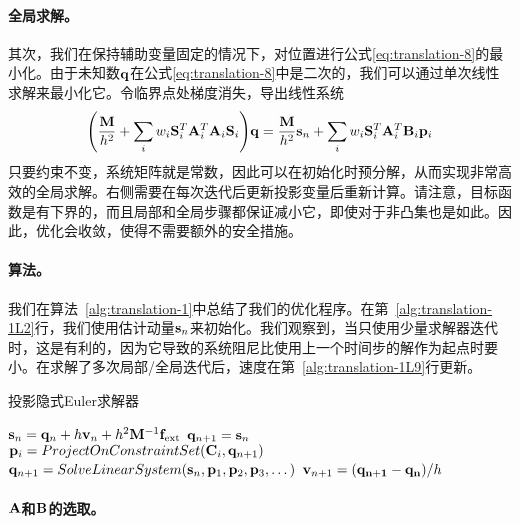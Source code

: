 \begin{translation}
\paragraph{全局求解。}

其次，我们在保持辅助变量固定的情况下，对位置进行公式\eqref{eq:translation-8}的最小化。由于未知数$\vb{q}$在公式\eqref{eq:translation-8}中是二次的，我们可以通过单次线性求解来最小化它。令临界点处梯度消失，导出线性系统
\begin{equation}
  \pqty{\frac{\vb{M}}{h^2} + \sum_i w_i \vb{S}_i^T \vb{A}_i^T \vb{A}_i \vb{S}_i} \vb{q} = \frac{\vb{M}}{h^2} \vb{s}_n + \sum_i w_i \vb{S}_i^T \vb{A}_i^T \vb{B}_i \vb{p}_i
  \label{eq:translation-10}
\end{equation}
只要约束不变，系统矩阵就是常数，因此可以在初始化时预分解，从而实现非常高效的全局求解。右侧需要在每次迭代后更新投影变量后重新计算。请注意，目标函数是有下界的，而且局部和全局步骤都保证减小它，即使对于非凸集也是如此。因此，优化会收敛，使得不需要额外的安全措施。

\paragraph{算法。}

我们在算法~\ref{alg:translation-1}中总结了我们的优化程序。在第~\ref{alg:translation-1L2}行，我们使用估计动量$\vb{s}_n$来初始化。我们观察到，当只使用少量求解器迭代时，这是有利的，因为它导致的系统阻尼比使用上一个时间步的解作为起点时要小。在求解了多次局部/全局迭代后，速度在第~\ref{alg:translation-1L9}行更新。

\begin{algorithm}
  \caption{投影隐式Euler求解器}
  \label{alg:translation-1}
  \small
  \begin{algorithmic}[1]
    \STATE $\vb{s}_n = \vb{q}_n + h \vb{v}_n + h^2 \vb{M}^{-1} \vb{f}_{\text{ext}}$
    \STATE $\vb{q}_{n + 1} = \vb{s}_n$ \label{alg:translation-1L2}
    \STATE $\vb{p}_i = ProjectOnConstraintSet(\vb{C}_i, \vb{q}_{n + 1})$ \label{alg:translation-1L5}
    \ENDFOR
    \STATE $\vb{q}_{n + 1} = SolveLinearSystem(\vb{s}_n, \vb{p}_1, \vb{p}_2, \vb{p}_3, \dots)$ \label{alg:translation-1L7}
    \ENDFOR
    \STATE $\vb{v}_{n + 1} = (\vb{q_{n + 1} - \vb{q}_n}) / h$ \label{alg:translation-1L9}
  \end{algorithmic}
\end{algorithm}

\paragraph{$\vb{A}$和$\vb{B}$的选取。}


\end{translation}
